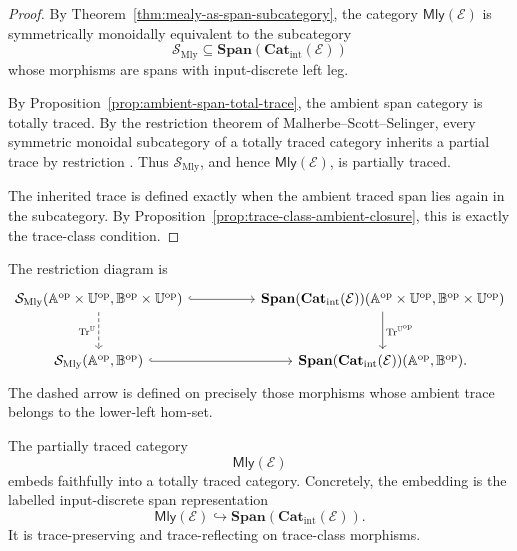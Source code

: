 \begin{proof}
By Theorem~\ref{thm:mealy-as-span-subcategory}, the category
\(\mathsf{Mly}(\mathcal E)\) is symmetrically monoidally equivalent to the
subcategory
\[
\mathcal S_{\mathrm{Mly}}
\subseteq
\mathbf{Span}(\mathbf{Cat}_{\mathrm{int}}(\mathcal E))
\]
whose morphisms are spans with input-discrete left leg.

By Proposition~\ref{prop:ambient-span-total-trace}, the ambient span category
is totally traced.  By the restriction theorem of
Malherbe--Scott--Selinger, every symmetric monoidal subcategory of a totally
traced category inherits a partial trace by restriction
\cite{MalherbeScottSelingerPartiallyTracedCategories}.  Thus
\(\mathcal S_{\mathrm{Mly}}\), and hence \(\mathsf{Mly}(\mathcal E)\), is
partially traced.

The inherited trace is defined exactly when the ambient traced span lies again
in the subcategory.  By Proposition~\ref{prop:trace-class-ambient-closure},
this is exactly the trace-class condition.
\end{proof}

The restriction diagram is
\[
\begin{tikzcd}[column sep=huge,row sep=large]
\mathcal S_{\mathrm{Mly}}(\mathbb A^{\mathrm{op}}\times\mathbb U^{\mathrm{op}},
\mathbb B^{\mathrm{op}}\times\mathbb U^{\mathrm{op}})
  \arrow[r, hook]
  \arrow[d, dashed, "{\operatorname{Tr}^{\mathbb U}}"']
&
\mathbf{Span}(\mathbf{Cat}_{\mathrm{int}}(\mathcal E))
(\mathbb A^{\mathrm{op}}\times\mathbb U^{\mathrm{op}},
\mathbb B^{\mathrm{op}}\times\mathbb U^{\mathrm{op}})
  \arrow[d, "{\operatorname{Tr}^{\mathbb U^{\mathrm{op}}}}"]
\\
\mathcal S_{\mathrm{Mly}}(\mathbb A^{\mathrm{op}},\mathbb B^{\mathrm{op}})
  \arrow[r, hook]
&
\mathbf{Span}(\mathbf{Cat}_{\mathrm{int}}(\mathcal E))
(\mathbb A^{\mathrm{op}},\mathbb B^{\mathrm{op}}).
\end{tikzcd}
\]
The dashed arrow is defined on precisely those morphisms whose ambient trace
belongs to the lower-left hom-set.

\begin{corollary}
\label{cor:mealy-partial-trace-total-embedding}
The partially traced category
\[
\mathsf{Mly}(\mathcal E)
\]
embeds faithfully into a totally traced category.  Concretely, the embedding is
the labelled input-discrete span representation
\[
\mathsf{Mly}(\mathcal E)
\hookrightarrow
\mathbf{Span}(\mathbf{Cat}_{\mathrm{int}}(\mathcal E)).
\]
It is trace-preserving and trace-reflecting on trace-class morphisms.
\end{corollary}

